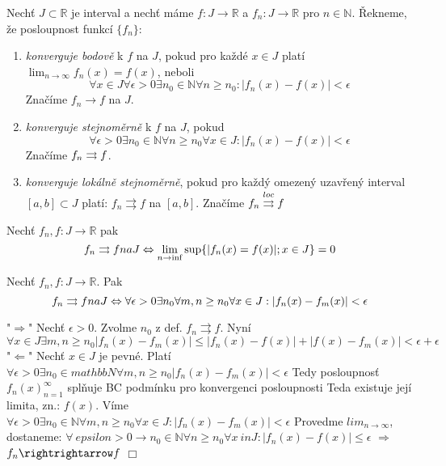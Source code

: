 \begin{definice}
Nechť $J \subset \mathbb{R}$ je interval a nechť máme $f : J \rightarrow \mathbb{R}$ a $f_n : J \rightarrow \mathbb{R}$ pro $n \in \mathbb{N}$. Řekneme, že posloupnost funkcí $\{f_n\}$:

\begin{enumerate}
\item \emph{konverguje bodově} k $f$ na $J$, pokud pro každé $x \in J$ platí $\lim_{n \rightarrow \infty} f_n(x) = f(x)$, neboli
$$\forall x \in J \forall \epsilon > 0 \exists n_0 \in \mathbb{N} \forall n \geq n_0 : |f_n(x) - f(x)| < \epsilon$$
Značíme $f_n \rightarrow f$ na $J$.
\item \emph{konverguje stejnoměrně} k $f$ na $J$, pokud
$$\forall \epsilon > 0 \exists n_0 \in \mathbb{N} \forall n \geq n_0 \forall x \in J : | f_n(x) - f(x) | < \epsilon$$
Značíme $f_n \rightrightarrows f$.
\item \emph{konverguje lokálně stejnoměrně}, pokud pro každý omezený uzavřený interval $[a, b] \subset J$ platí: $f_n \rightrightarrows f$ na $[a, b]$. Značíme $f_n \overset{loc}{\rightrightarrows} f$
\end{enumerate}
\end{definice}

\begin{vetal}
Nechť $f_n, f:J \rightarrow \mathbb{R}$ pak
$$f_n \con f na J \Leftrightarrow \lim_{n \rightarrow \inf} \sup \{ |f_n(x) = f(x)|; x \in J \} = 0$$
\end{vetal}
\begin{dukaz}
$f_n \rightrightarrows f \leftrightarrow \forall \epsilon > 0 \exists n_0 \in \mathbb{N} \forall n \qeg n_0 \forall x \in J: |f_n(x) - f(x)| < \epsilon$
$\Leftrightarrow$
$\forall \epsilon > 0 \exists n_0 \in \mathbb{N} \forall n \geq n_0 : \sup \{|f_n(x) - f(x)|; x\in J} \leq \epsilon$
$\Leftrightarrow$
$\lim_{n \to infty} sup{|f_n(x)-f(x)|;x \in J} = 0$
$\Box$
\end{dukaz}

\begin{vetat}
Nechť $f_n,f : J \rightarrow \mathbb{R}$. Pak
$$f_n \rightrightarrows f na J \Leftrightarrow \forall \epsilon > 0 \exists n_0 \forall m,n \geq n_0 \forall x \in J : | f_n(x) - f_m(x)| < \epsilon$$
\end{vetat}
\begin{dukaz}
"$\Rightarrow$" 
Nechť $\epsilon > 0.$ Zvolme $n_0$ z def. $f_n \rightrightarrows f.$ 
Nyní $\forall x \in J \exists m,n \geq n_0 |f_n(x) - f_m(x) | \leq |f_n(x) - f(x)| + |f(x) - f_m(x)| < \epsilon + \epsilon $
"$\Leftarrow$"
Nechť $x \in J$ je pevné. Platí $\forall \epsilon > 0 \exists n_0 \in mathbb{N} \forall m,n \geq n_0|f_n(x) - f_m(x)| < \epsilon$
Tedy posloupnosť ${f_n(x)}_{n=1}^\infty$ splňuje BC podmínku pro konvergenci posloupnosti Teda existuje její limita, zn.: $f(x)$.
Víme $\forall \epsilon > 0 \exists n_0 \in \mathbb{N} \forall m,n \geq n_0 \forall x \in J: |f_n(x)-f_m(x)|<\epsilon$
Provedme $lim_{n \to \infty}$, dostaneme:
$\forall \ epsilon > 0 \rightarrow n_0 \in \mathbb{N} \forall n \geq n_0 \forall x\ in J: |f_n(x) - f(x)| \leq \epsilon$
$\Rightarrow$
$f_n \rightrightarrow f$
$\Box$
\end{dukaz}

